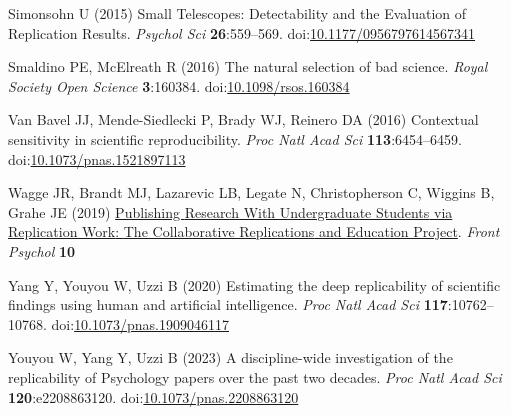 \documentclass[
  english,
  a4paper,
]{article}
\newlength{\cslhangindent}
\newlength{\cslentryspacingunit} %
\newenvironment{CSLReferences}[2] %
 {%
  \setlength{\parindent}{0pt}
  \ifodd #1
  \let\oldpar\par
  \def\par{\hangindent=\cslhangindent\oldpar}
  \fi
  \setlength{\parskip}{#2\cslentryspacingunit}
 }%
 {}
\begin{document}
\begin{CSLReferences}{1}{0}
\leavevmode{}%
Simonsohn U (2015) Small {Telescopes}: {Detectability} and the {Evaluation} of {Replication Results}. \emph{Psychol Sci} \textbf{26}:559--569. doi:\href{https://doi.org/10.1177/0956797614567341}{10.1177/0956797614567341}

\leavevmode{}%
Smaldino PE, McElreath R (2016) The natural selection of bad science. \emph{Royal Society Open Science} \textbf{3}:160384. doi:\href{https://doi.org/10.1098/rsos.160384}{10.1098/rsos.160384}

\leavevmode{}%
Van Bavel JJ, Mende-Siedlecki P, Brady WJ, Reinero DA (2016) Contextual sensitivity in scientific reproducibility. \emph{Proc Natl Acad Sci} \textbf{113}:6454--6459. doi:\href{https://doi.org/10.1073/pnas.1521897113}{10.1073/pnas.1521897113}

\leavevmode{}%
Wagge JR, Brandt MJ, Lazarevic LB, Legate N, Christopherson C, Wiggins B, Grahe JE (2019) \href{https://www.frontiersin.org/articles/10.3389/fpsyg.2019.00247}{Publishing {Research With Undergraduate Students} via {Replication Work}: {The Collaborative Replications} and {Education Project}}. \emph{Front Psychol} \textbf{10}

\leavevmode{}%
Yang Y, Youyou W, Uzzi B (2020) Estimating the deep replicability of scientific findings using human and artificial intelligence. \emph{Proc Natl Acad Sci} \textbf{117}:10762--10768. doi:\href{https://doi.org/10.1073/pnas.1909046117}{10.1073/pnas.1909046117}

\leavevmode{}%
Youyou W, Yang Y, Uzzi B (2023) A discipline-wide investigation of the replicability of {Psychology} papers over the past two decades. \emph{Proc Natl Acad Sci} \textbf{120}:e2208863120. doi:\href{https://doi.org/10.1073/pnas.2208863120}{10.1073/pnas.2208863120}

\end{CSLReferences}
\end{document}
